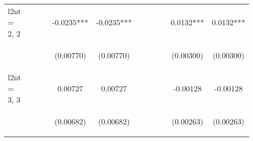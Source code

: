 \documentclass[]{article}
\begin{document}
\begin{center}
\begin{tabular}{lccccccccccc}
l2nt = 2, 2 &  &  &  & -0.0235*** & -0.0235*** &  &  &  &  & 0.0132*** & 0.0132*** \\
\vspace{4pt} & \begin{footnotesize}\end{footnotesize} & \begin{footnotesize}\end{footnotesize} & \begin{footnotesize}\end{footnotesize} & \begin{footnotesize}(0.00770)\end{footnotesize} & \begin{footnotesize}(0.00770)\end{footnotesize} & \begin{footnotesize}\end{footnotesize} & \begin{footnotesize}\end{footnotesize} & \begin{footnotesize}\end{footnotesize} & \begin{footnotesize}\end{footnotesize} & \begin{footnotesize}(0.00300)\end{footnotesize} & \begin{footnotesize}(0.00300)\end{footnotesize} \\
l2nt = 3, 3 &  &  &  & 0.00727 & 0.00727 &  &  &  &  & -0.00128 & -0.00128 \\
\vspace{4pt} & \begin{footnotesize}\end{footnotesize} & \begin{footnotesize}\end{footnotesize} & \begin{footnotesize}\end{footnotesize} & \begin{footnotesize}(0.00682)\end{footnotesize} & \begin{footnotesize}(0.00682)\end{footnotesize} & \begin{footnotesize}\end{footnotesize} & \begin{footnotesize}\end{footnotesize} & \begin{footnotesize}\end{footnotesize} & \begin{footnotesize}\end{footnotesize} & \begin{footnotesize}(0.00263)\end{footnotesize} & \begin{footnotesize}(0.00263)\end{footnotesize} \\

\end{tabular}
\end{center}
\end{document}
